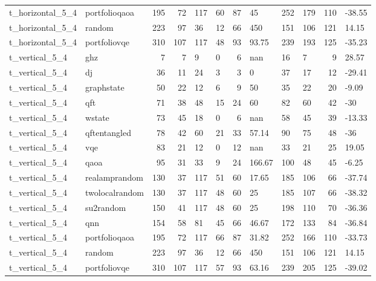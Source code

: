 \begin{longtable}{llrrllrlllrl}
t\_horizontal\_5\_4 & portfolioqaoa & 195 & 72 & 117 & 60 & 87 & 45 & 252 & 179 & 110 & -38.55 \\
t\_horizontal\_5\_4 & random & 223 & 97 & 36 & 12 & 66 & 450 & 151 & 106 & 121 & 14.15 \\
t\_horizontal\_5\_4 & portfoliovqe & 310 & 107 & 117 & 48 & 93 & 93.75 & 239 & 193 & 125 & -35.23 \\
t\_vertical\_5\_4 & ghz & 7 & 7 & 9 & 0 & 6 & nan & 16 & 7 & 9 & 28.57 \\
t\_vertical\_5\_4 & dj & 36 & 11 & 24 & 3 & 3 & 0 & 37 & 17 & 12 & -29.41 \\
t\_vertical\_5\_4 & graphstate & 50 & 22 & 12 & 6 & 9 & 50 & 35 & 22 & 20 & -9.09 \\
t\_vertical\_5\_4 & qft & 71 & 38 & 48 & 15 & 24 & 60 & 82 & 60 & 42 & -30 \\
t\_vertical\_5\_4 & wstate & 73 & 45 & 18 & 0 & 6 & nan & 58 & 45 & 39 & -13.33 \\
t\_vertical\_5\_4 & qftentangled & 78 & 42 & 60 & 21 & 33 & 57.14 & 90 & 75 & 48 & -36 \\
t\_vertical\_5\_4 & vqe & 83 & 21 & 12 & 0 & 12 & nan & 33 & 21 & 25 & 19.05 \\
t\_vertical\_5\_4 & qaoa & 95 & 31 & 33 & 9 & 24 & 166.67 & 100 & 48 & 45 & -6.25 \\
t\_vertical\_5\_4 & realamprandom & 130 & 37 & 117 & 51 & 60 & 17.65 & 185 & 106 & 66 & -37.74 \\
t\_vertical\_5\_4 & twolocalrandom & 130 & 37 & 117 & 48 & 60 & 25 & 185 & 107 & 66 & -38.32 \\
t\_vertical\_5\_4 & su2random & 150 & 41 & 117 & 48 & 60 & 25 & 198 & 110 & 70 & -36.36 \\
t\_vertical\_5\_4 & qnn & 154 & 58 & 81 & 45 & 66 & 46.67 & 172 & 133 & 84 & -36.84 \\
t\_vertical\_5\_4 & portfolioqaoa & 195 & 72 & 117 & 66 & 87 & 31.82 & 252 & 166 & 110 & -33.73 \\
t\_vertical\_5\_4 & random & 223 & 97 & 36 & 12 & 66 & 450 & 151 & 106 & 121 & 14.15 \\
t\_vertical\_5\_4 & portfoliovqe & 310 & 107 & 117 & 57 & 93 & 63.16 & 239 & 205 & 125 & -39.02 \\
\end{longtable}
